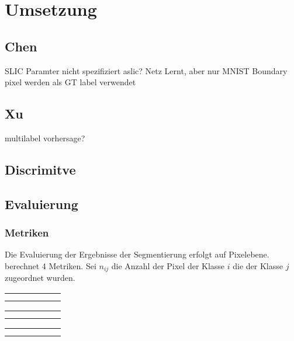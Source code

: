 \chapter{Umsetzung}
\label{chap:umsetzung}
\section{Chen}
SLIC Paramter nicht spezifiziert 
aslic?
Netz Lernt, aber nur MNIST
Boundary pixel werden als GT label verwendet

\section{Xu}
multilabel vorhersage?

\section{Discrimitve}

\section{Evaluierung}
\label{chap:eval}




\subsection{Metriken}
Die Evaluierung der Ergebnisse der Segmentierung erfolgt auf Pixelebene.
\cite{LongFullyconvolutionalnetworks2015} berechnet 4 Metriken.
Sei \(n_{ij}\) die Anzahl der Pixel der Klasse \(i\) die der Klasse \(j\) zugeordnet wurden.


\newcommand{\resulttable}[3]{
    \begin{tabular}{l|r|r|r|r|r}%
    \hline
        \csvreader[head to column names, filter equal={\dataset}{#2}]{#1}{}%
        {#3}
        \end{tabular}
}
\begin{table*}
    \resulttable{results/document_image_segmentation_results.csv}{CB55}{ \name & \pixelacc & \FgPA & \meanacc & \meanIU & \fwIU\\}
    \resulttable{results/document_image_segmentation_results.csv}{CSG18}{  \pixelacc & \FgPA & \meanacc & \meanIU & \fwIU\\}
    \resulttable{results/document_image_segmentation_results.csv}{CSG863}{  \pixelacc & \FgPA & \meanacc & \meanIU & \fwIU\\}
        
\end{table*}